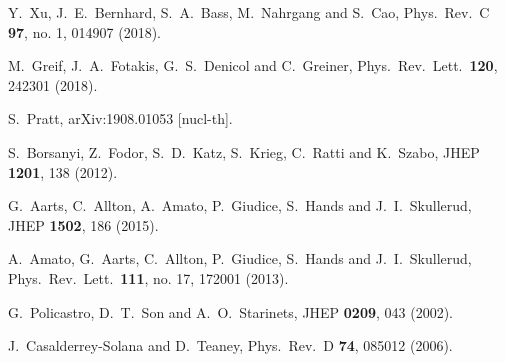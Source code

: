 \documentclass[aps,prc,nofootinbib,showpacs,superscriptaddress,groupedaddress]{revtex4-1}
\begin{document}
\begin{thebibliography}{99}
  Y.~Xu, J.~E.~Bernhard, S.~A.~Bass, M.~Nahrgang and S.~Cao,
  Phys.\ Rev.\ C {\bf 97}, no. 1, 014907 (2018).
  
  M.~Greif, J.~A.~Fotakis, G.~S.~Denicol and C.~Greiner,
  Phys.\ Rev.\ Lett.\  {\bf 120}, 242301 (2018).

  S.~Pratt,
  arXiv:1908.01053 [nucl-th].

  S.~Borsanyi, Z.~Fodor, S.~D.~Katz, S.~Krieg, C.~Ratti and K.~Szabo,
  JHEP {\bf 1201}, 138 (2012).

  G.~Aarts, C.~Allton, A.~Amato, P.~Giudice, S.~Hands and J.~I.~Skullerud,
  JHEP {\bf 1502}, 186 (2015).

  A.~Amato, G.~Aarts, C.~Allton, P.~Giudice, S.~Hands and J.~I.~Skullerud,
  Phys.\ Rev.\ Lett.\  {\bf 111}, no. 17, 172001 (2013).

  G.~Policastro, D.~T.~Son and A.~O.~Starinets,
  JHEP {\bf 0209}, 043 (2002).

  J.~Casalderrey-Solana and D.~Teaney,
  Phys.\ Rev.\ D {\bf 74}, 085012 (2006).


\end{thebibliography}
\end{document}
